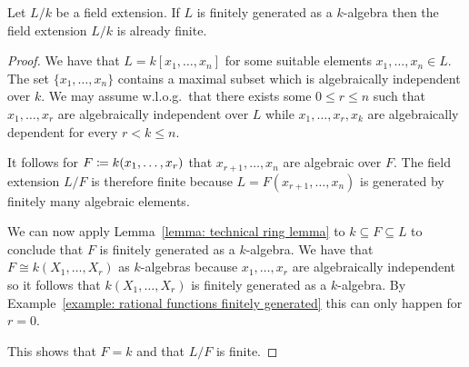 \begin{corollary}
  \label{corollary: finitely generated field extensions are finite}
  Let $L/k$ be a field extension.
  If $L$ is finitely generated as a $k$-algebra then the field extension $L/k$ is already finite.
\end{corollary}


\begin{proof}
  We have that $L = k[x_1, \dotsc, x_n]$ for some suitable elements $x_1, \dotsc, x_n \in L$.
  The set $\{x_1, \dotsc, x_n\}$ contains a maximal subset which is algebraically independent over $k$.
  We may assume w.l.o.g.\ that there exists some $0 \leq r \leq n$ such that $x_1, \dotsc, x_r$ are algebraically independent over $L$ while $x_1, \dotsc, x_r, x_k$ are algebraically dependent for every $r < k \leq n$.
  
  It follows for $F \coloneqq k(x_1, \dotsc, x_r)$ that $x_{r+1}, \dotsc, x_n$ are algebraic over $F$.
  The field extension $L/F$ is therefore finite because $L = F(x_{r+1}, \dotsc, x_n)$ is generated by finitely many algebraic elements.
  
  We can now apply Lemma~\ref{lemma: technical ring lemma} to $k \subseteq F \subseteq L$ to conclude that $F$ is finitely generated as a $k$-algebra.
  We have that $F \cong k(X_1, \dotsc, X_r)$ as $k$-algebras because $x_1, \dotsc, x_r$ are algebraically independent so it follows that $k(X_1, \dotsc, X_r)$ is finitely generated as a $k$-algebra.
  By Example~\ref{example: rational functions finitely generated} this can only happen for $r = 0$.
  
  This shows that $F = k$ and that $L/F$ is finite.
\end{proof}

